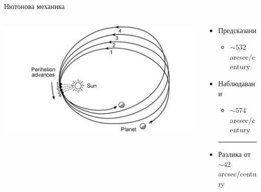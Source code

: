 \documentclass[10pt,a4paper]{beamer}
\begin{document}
        \begin{frame}{ Нютонова механика }
            \begin{columns}
                \begin{column}{0.5\textwidth}
                    \includegraphics[width=\textwidth]{images/newton_mercury_perihelion.jpg}
                \end{column}
                \begin{column}{0.5\textwidth}
                    \begin{itemize}
                        \item Предсказани \begin{itemize}
                            \item $ \sim 532 $ arcsec/century
                        \end{itemize}
                        \item Наблюдавани \begin{itemize}
                            \item $ \sim 574 $ arcsec/century
                        \end{itemize}
                        \noindent\rule{5cm}{0.5pt}
                        \item Разлика от $ \sim 42 $ arcsec/century
                    \end{itemize}
                \end{column}
            \end{columns}
        \end{frame}
    
\end{document}
